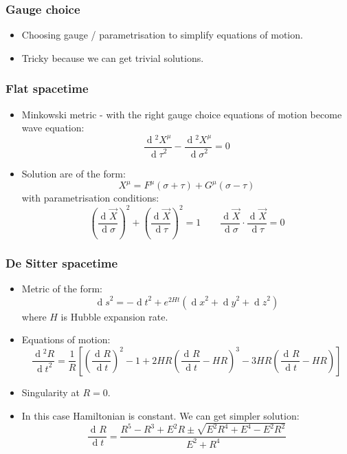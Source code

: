 \documentclass[aspectratio=43,serif]{beamer}
\newcommand{\D}[1]{\ensuremath{\operatorname{d}\!{#1}}}
\newcommand{\dif}[3][]{\frac{\D{{}^{#1}#2}}{\D{#3}^{#1}}}
\newcommand{\lp}{\left(}
\newcommand{\rp}{\right)}
\begin{document}
\begin{frame}
	\frametitle{Gauge choice}
	\begin{itemize}
		\item Choosing gauge / parametrisation to simplify equations of motion.
		\item Tricky because we can get trivial solutions.
	\end{itemize}

\end{frame}


\begin{frame}
	\frametitle{Flat spacetime}
	\begin{itemize}
		\item Minkowski metric - with the right gauge choice equations of motion become wave equation:
		$$
		\dif[2] {X^{\mu}} {\tau} - \dif[2] {X^{\mu}} {\sigma} = 0
		$$
		\item Solution are of the form:
		$$
		X^{\mu} = F^{\mu}(\sigma+\tau) + G^{\mu}(\sigma - \tau)
		$$
		with parametrisation conditions:
		$$
		\lp \dif {\vec{X}} \sigma \rp^2 + \lp \dif {\vec{X}} \tau \rp^2 = 1  \qquad \dif {\vec{X}} \sigma \cdot \dif {\vec{X}} \tau = 0
		$$
	\end{itemize}
\end{frame}



\begin{frame}
	\frametitle{De Sitter spacetime}
	\begin{itemize}
		\item Metric of the form:
		$$		
		\D s^2 = -\D t^2 + e^{2Ht} \lp \D x^2 + \D y^2 + \D z^2 \rp
		$$
		where $H$ is Hubble expansion rate.
		
		\item Equations of motion:
		$$
		\dif[2] R t = \frac{1}{R} \left[ \lp \dif R t \rp^2 - 1 + 2HR \lp \dif R t - HR \rp^3 - 3HR \lp \dif R t - HR \rp \right]
		$$
		\item Singularity at $R = 0$. 
		\item In this case Hamiltonian is constant. We can get simpler solution:
		$$
		\dif R t = \frac{R^5 - R^3 + E^2 R \pm \sqrt{E^2 R^4 + E^4 - E^2 R^2}}{E^2 + R^4}
		$$
	\end{itemize}
\end{frame}
\end{document}
